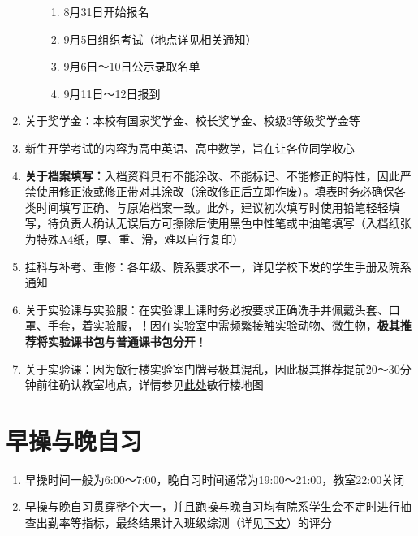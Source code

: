 \begin{enumerate}
\begin{enumerate}
\begin{enumerate}
                        \item 8月31日开始报名
                        \item 9月5日组织考试（地点详见相关通知）
                        \item 9月6日～10日公示录取名单\footnotemark
                        \item 9月11日～12日报到
                    \end{enumerate}
          \end{enumerate}
    \item 关于奖学金\footnotemark：本校有国家奖学金、校长奖学金、校级3等级奖学金等
    \item 新生开学考试\footnotemark 的内容为高中英语、高中数学，旨在让各位同学收心
    \item \textbf{关于档案填写：}入档资料具有不能涂改、不能标记、不能修正的特性，因此严禁使用修正液或修正带对其涂改（涂改修正后立即作废）。填表时务必确保各类时间填写正确、与原始档案一致。此外，建议初次填写时使用铅笔轻轻填写，待负责人确认无误后方可擦除后使用黑色中性笔或中油笔填写（入档纸张为特殊A4纸，厚、重、滑，难以自行复印）
    \item 挂科与补考、重修：各年级、院系要求不一，详见学校下发的学生手册及院系通知
    \item 关于实验课与实验服：在实验课上课时务必按要求正确洗手并佩戴头套、口罩、手套，着实验服，\textbf{！}因在实验室中需频繁接触实验动物、微生物，\textbf{极其推荐将实验课书包与普通课书包分开}！
          \label{schoolbag}
    \item 关于实验课：因为敏行楼实验室门牌号极其混乱，因此极其推荐提前20～30分钟前往确认教室地点，详情参见\hyperref[map_fuyanshan_minxing]{此处}敏行楼地图
\end{enumerate}

\section[早操与晚自习]{早操与晚自习}
\begin{enumerate}
    \item 早操时间一般为6:00～7:00，晚自习时间通常为19:00～21:00，教室22:00关闭
    \item 早操与晚自习贯穿整个大一\footnotemark，并且跑操与晚自习均有院系学生会不定时进行抽查出勤率等指标，最终结果计入班级综测（详见\hyperref[class_evaluation]{下文}）的评分
\end{enumerate}


